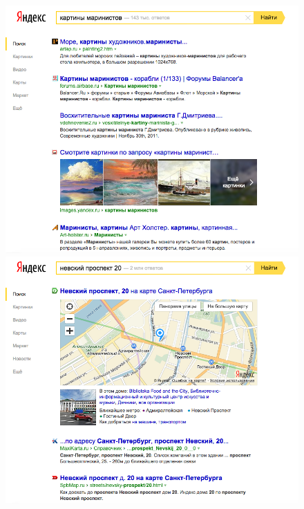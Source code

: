 \documentclass[12pt,a4paper]{report}
\begin{document}
\begin{figure}[b!]
  \centering
  \includegraphics[height=0.27\textheight]{pics/VerticalResults-Images-Yandex.png}
  \includegraphics[height=0.27\textheight]{pics/VerticalResults-Maps-Yandex.png}
  \vfill\vfill

\end{figure}
\end{document}
